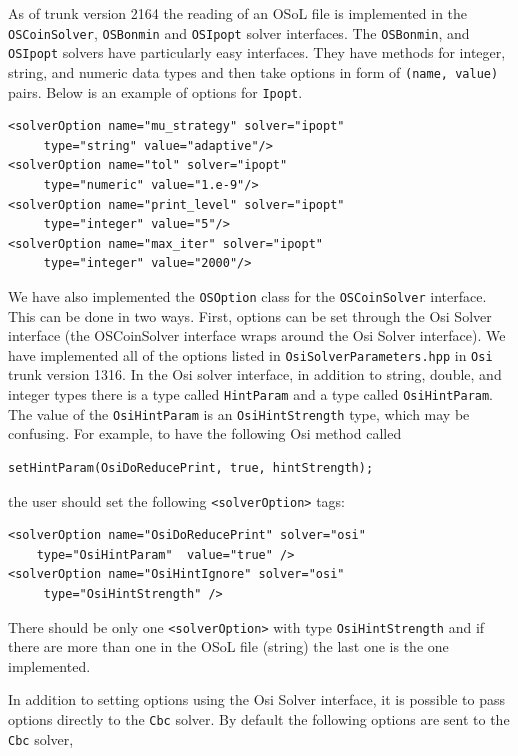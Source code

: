 As of trunk version 2164 the reading of an
OSoL file is implemented in the {\tt OSCoinSolver}, {\tt OSBonmin} and
{\tt OSIpopt} solver interfaces.   The  {\tt OSBonmin}, and {\tt OSIpopt}
solvers have particularly easy interfaces. They have methods for integer,
string, and numeric data types and then take options in form of
{\tt (name, value)} pairs. Below is an example of options for {\tt Ipopt}.


\begin{verbatim}
<solverOption name="mu_strategy" solver="ipopt" 
     type="string" value="adaptive"/>
<solverOption name="tol" solver="ipopt" 
     type="numeric" value="1.e-9"/>
<solverOption name="print_level" solver="ipopt" 
     type="integer" value="5"/>
<solverOption name="max_iter" solver="ipopt" 
     type="integer" value="2000"/>
\end{verbatim}

We have also implemented the {\tt OSOption} class for the {\tt OSCoinSolver} interface. This can be done in two ways. 
First, options can be set through the Osi Solver interface (the OSCoinSolver interface wraps around the Osi Solver interface).    
We have implemented all of the options listed in {\tt OsiSolverParameters.hpp} in {\tt Osi} trunk version 1316.  
In the Osi solver interface, in addition to string, double, and integer types  there is a type called {\tt HintParam}
and a type called {\tt OsiHintParam}. The value of the {\tt OsiHintParam} is an {\tt OsiHintStrength} type, 
which may be confusing. For example, to have the following Osi method called

\begin{verbatim}
setHintParam(OsiDoReducePrint, true, hintStrength);
\end{verbatim}


the user should set the following {\tt <solverOption>} tags:
\begin{verbatim}
<solverOption name="OsiDoReducePrint" solver="osi" 
    type="OsiHintParam"  value="true" />
<solverOption name="OsiHintIgnore" solver="osi" 
     type="OsiHintStrength" />
\end{verbatim}
There should be only one {\tt <solverOption>} with type {\tt OsiHintStrength} and if there are more than one in the 
OSoL file (string) the last one is the one implemented. 

In addition to setting options using the Osi  Solver interface, it is possible to pass options directly to the {\tt Cbc} 
solver. By default the following options are sent to the {\tt Cbc} solver,

